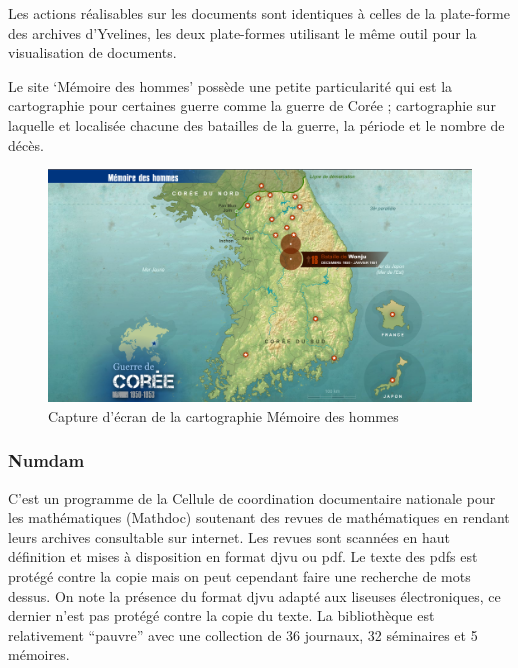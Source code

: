         Les actions réalisables sur les documents sont identiques à celles de la plate-forme
        des archives d’Yvelines, les deux plate-formes utilisant le même outil pour la visualisation
        de documents.

        Le site ‘Mémoire des hommes’ possède une petite particularité qui est la cartographie pour
        certaines guerre comme la guerre de Corée ; cartographie sur laquelle et localisée chacune
        des batailles de la guerre, la période et le nombre de décès.

        \begin{figure}[ht!]
            \centering
            \includegraphics[width=1\textwidth]{figure/screen_memoire_hommes.png}
            \caption{Capture d'écran de la cartographie Mémoire des hommes}
            \label{fig:memoire_hommes}
        \end{figure}

        \subsubsection{Numdam}
        \label{subsubsec:numdam}
        C’est un programme de la Cellule de coordination documentaire nationale pour les mathématiques (Mathdoc) soutenant des revues
        de mathématiques en rendant leurs archives consultable sur internet. Les revues sont scannées en haut définition et mises
        à disposition en format djvu ou pdf. Le texte des pdfs est protégé contre la copie mais on peut cependant faire
        une recherche de mots dessus. On note la présence du format djvu adapté aux liseuses électroniques, ce dernier n’est
        pas protégé contre la copie du texte. La bibliothèque est relativement “pauvre” avec une collection de 36 journaux, 32 séminaires et 5 mémoires.

